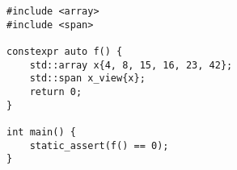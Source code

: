 \begin{lstlisting}[title=\href{https://godbolt.org/z/CHeY7r}{\texttt{godbolt.org/z/CHeY7r}}]
#include <array>
#include <span>

constexpr auto f() {
    std::array x{4, 8, 15, 16, 23, 42};
    std::span x_view{x};
    return 0;
}

int main() {
    static_assert(f() == 0);
}
\end{lstlisting}
